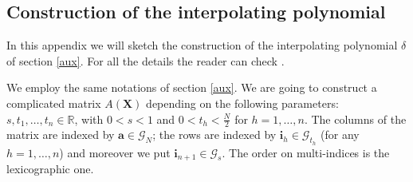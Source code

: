 \documentclass[10 pt,a4paper]{article}
\theoremstyle{plain}
\theoremstyle{definition}
\theoremstyle{named}
\begin{document}
\begin{appendices}
\section{Construction of the interpolating polynomial}\label{ap}
In this appendix we will sketch the construction of the interpolating polynomial $\delta$ of section \ref{aux}. For all the details the reader can check \cite{C}.

We employ the same notations of section \ref{aux}. We are going to construct a complicated matrix $A(\bm{X})$ depending on the following parameters:  $s, t_1,\dots, t_n\in\mathbb R$, with $0<s<1$ and $0< t_h<\frac{N}{2}$ for $h=1,\dots ,n$. The columns of the matrix are indexed by  $\bm a\in\mathcal G_N$; the rows are indexed by $\bm i_h\in\mathcal G_{t_h}$ (for any $h=1,\ldots, n$) and moreover we put $\bm i_{n+1}\in\mathcal G_s$. The order on multi-indices is the lexicographic one.





\end{appendices}
\end{document}
